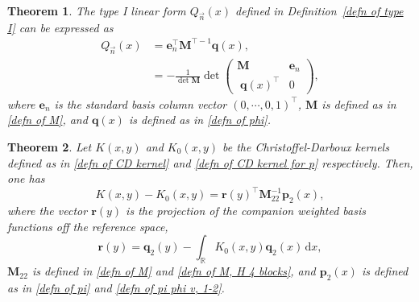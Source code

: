 \documentclass[a4paper,10pt,leqno]{amsart}
\numberwithin{equation}{section}
\newtheorem{theorem}{Theorem}[section]
\theoremstyle{remark}
\newcommand{\dd}{\mathrm{d}}
\newcommand{\R}{\mathbb{R}}
\begin{document}
\begin{theorem}\label{type I reduction}
The type I linear form $Q_{\vec{n}}(x)$ defined in Definition~\ref{defn of type I} can be expressed as
\begin{align}\label{eq:Q_sol_general}
Q_{\vec{n}}(x) &= \bm{e}_n^\top \bm{M}^{\top-1} \bm{q}(x),\\
&= -\frac{1}{\det \bm{M}} \det
\begin{pmatrix}
 \bm{M} & \bm{e}_n\\
\;\bm{q}(x)^\top  &  0
\end{pmatrix},
\end{align}
where $\bm{e}_n$ is the standard basis column vector $(0, \cdots, 0, 1)^\top$, $\bm{M}$ is defined as in \eqref{defn of M}, and $\bm{q}(x)$ is defined as in \eqref{defn of phi}.
\end{theorem}

\begin{theorem}\label{kernel reduction}
Let $K(x,y)$ and $K_0(x,y)$ be the Christoffel-Darboux kernels defined as in \eqref{defn of CD kernel} and \eqref{defn of CD kernel for p} respectively.
Then, one has
\begin{equation} \label{reduction formula equation}
    K(x,y)-K_0(x,y) = \bm{r}(y)^\top \bm{M}_{22}^{-1} \bm{p}_2(x),
\end{equation}
where the vector $\bm{r}(y)$ is the projection of the companion weighted basis functions off the reference space,
\begin{equation} \label{defn of q}
\bm{r}(y) = \bm{q}_2(y) - \int_{\R} K_0(x,y) \bm{q}_2(x) \, \dd x,
\end{equation}
$\bm{M}_{22}$ is defined in \eqref{defn of M} and \eqref{defn of M, H 4 blocks}, and $\bm{p}_2(x)$ is defined as in \eqref{defn of pi} and \eqref{defn of pi phi v, 1-2}.
\end{theorem}
\end{document}
